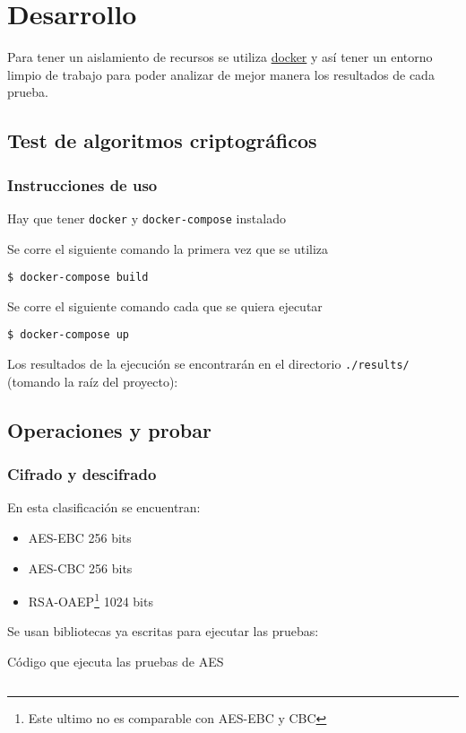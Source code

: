 \documentclass[../main.tex]{subfiles}
\begin{document}
\section{Desarrollo}\label{sec:desarrollo}

Para tener un aislamiento de recursos se utiliza \href{https://www.docker.com/}{docker} y así tener un entorno limpio
de trabajo para poder analizar de mejor manera los resultados de cada prueba.

\subsection{Test de algoritmos criptográficos}\label{test-de-algoritmos-criptograficos}

\subsubsection{Instrucciones de uso}\label{instrucciones-de-uso}

Hay que tener \texttt{docker} y \texttt{docker-compose} instalado

Se corre el siguiente comando la primera vez que se utiliza

\begin{code}
\begin{verbatim}
$ docker-compose build
\end{verbatim}
\end{code}
Se corre el siguiente comando cada que se quiera ejecutar
\begin{code}
\begin{verbatim}
$ docker-compose up
\end{verbatim}
\end{code}
Los resultados de la ejecución se encontrarán en el directorio \texttt{./results/}
(tomando la raíz del proyecto):

\subsection{Operaciones y probar}\label{clasificaciuxf2n-de-operaciones}
\subsubsection{Cifrado y descifrado}\label{sec:cifrado-y-descifrado}
En esta clasificación se encuentran:
\begin{itemize}
  \item AES-EBC 256 bits
  \item AES-CBC 256 bits
  \item RSA-OAEP\footnote{Este ultimo no es comparable con AES-EBC y CBC} 1024 bits
\end{itemize}
Se usan bibliotecas ya escritas para ejecutar las pruebas:
\begin{code}
  \caption{Código que ejecuta las pruebas de AES}\label{sec:cifrado-y-descifrado-1}
  \inputminted[lastline=74]{python}{../src/test_algoritmos_crypto/AESTests.py}
\end{code}
\end{document}
